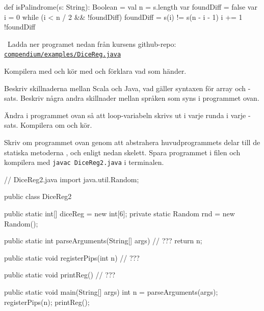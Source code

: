 \SubtaskSolved

\begin{Code}
def isPalindrome(s: String): Boolean = {
  val n = s.length
  var foundDiff = false
  var i = 0
  while (i < n / 2 && !foundDiff)  {
    foundDiff = s(i) != s(n - i - 1)
    i += 1
  }
  !foundDiff
}
\end{Code}

\QUESTEND





\QUESTBEGIN

\Task  \what~Ladda ner programet nedan från kursens github-repo: \href{https://raw.githubusercontent.com/lunduniversity/introprog/master/compendium/examples/DiceReg.java}{\texttt{compendium/examples/DiceReg.java}}


\Subtask
Kompilera med  och kör med  och förklara vad som händer.


\Subtask Beskriv skillnaderna mellan Scala och Java, vad gäller syntaxen för array och -sats. Beskriv några andra skillnader mellan språken som syns i programmet ovan.

\Subtask Ändra i programmet ovan så att loop-variabeln  skrivs ut i varje runda i varje -sats. Kompilera om och kör.

\Subtask Skriv om programmet ovan genom att abstrahera huvudprogrammets delar till de statiska metoderna ,  och  enligt nedan skelett. Spara programmet i filen  och kompilera med \texttt{javac DiceReg2.java} i terminalen.

\begin{Code}[language=Java]
// DiceReg2.java
import java.util.Random;

public class DiceReg2 {
    public static int[] diceReg = new int[6];
    private static Random rnd = new Random();

    public static int parseArguments(String[] args) {
        // ???
        return n;
    }

    public static void registerPips(int n){
        // ???
    }

    public static void printReg() {
        // ???
    }

    public static void main(String[] args) {
        int n = parseArguments(args);
        registerPips(n);
        printReg();
    }
}
\end{Code}

